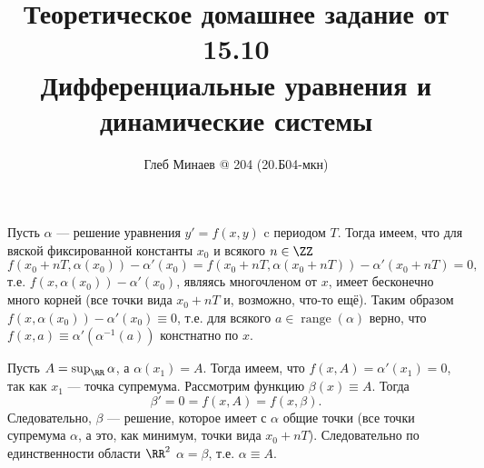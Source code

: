 \documentclass[12pt,a4paper]{article}
\title{Теоретическое домашнее задание от 15.10\\Дифференциальные уравнения и динамические системы}
\author{Глеб Минаев @ 204 (20.Б04-мкн)}
\newcommand{\range}{\mathop{\mathrm{range}}}
\begin{document}
    \maketitle
    
    \begin{problem}{7}
        Пусть $\alpha$ --- решение уравнения $y' = f(x, y)$ c периодом $T$. Тогда имеем, что для вяской фиксированной константы $x_0$ и всякого $n \in \ZZ$
        \[f(x_0 + nT, \alpha(x_0)) - \alpha'(x_0) = f(x_0 + nT, \alpha(x_0 + nT)) - \alpha'(x_0 + nT) = 0,\]
        т.е. $f(x, \alpha(x_0)) - \alpha'(x_0)$, являясь многочленом от $x$, имеет бесконечно много корней (все точки вида $x_0 + nT$ и, возможно, что-то ещё). Таким образом $f(x, \alpha(x_0)) - \alpha'(x_0) \equiv 0$, т.е. для всякого $a \in \range(\alpha)$ верно, что $f(x, a) \equiv \alpha'(\alpha^{-1}(a))$ констнатно по $x$.
        
        Пусть $A = \sup_\RR \alpha$, а $\alpha(x_1) = A$. Тогда имеем, что $f(x, A) = \alpha'(x_1) = 0$, так как $x_1$ --- точка супремума. Рассмотрим функцию $\beta(x) \equiv A$. Тогда
        \[\beta' = 0 = f(x, A) = f(x, \beta).\]
        Следовательно, $\beta$ --- решение, которое имеет с $\alpha$ общие точки (все точки супремума $\alpha$, а это, как минимум, точки вида $x_0 + nT$). Следовательно по единственности области $\RR^2$ $\alpha = \beta$, т.е. $\alpha \equiv A$.
    \end{problem}
\end{document}
